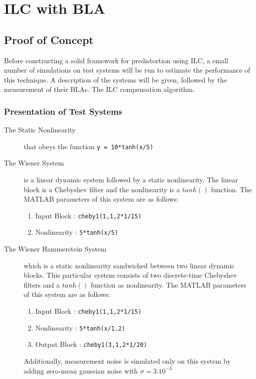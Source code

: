 %
%
\section{ILC with BLA}

	\subsection{Proof of Concept}
	Before constructing a solid framework for predistortion using ILC, a small number of simulations on test systems will be run to estimate the performance of this technique. A description of the systems will be given, followed by the measurement of their BLAs. The ILC compensation algorithm.

	\subsubsection{Presentation of Test Systems}
	\begin{description}
			\item[The Static Nonlinearity] that obeys the function \verb+y = 10*tanh(x/5)+

			 \item[The Wiener System] is a linear dynamic system followed by a static nonlinearity. The linear block is a Chebyshev filter and the nonlinearity is a $tanh()$ function. The MATLAB parameters of this system are as follows:
			\begin{enumerate}
			 	\item Input Block  : \verb+cheby1(1,1,2*1/15)+
			 	\item Nonlinearity : \verb+5*tanh(x/5)+
			 \end{enumerate} 

			\item[The Wiener Hammerstein System] which is a static nonlinearity sandwiched between two linear dynamic blocks. This particular system consists of two discrete-time Chebyshev filters and a $tanh()$ function as nonlinearity.
			The MATLAB parameters of this system are as follows:
			\begin{enumerate}
			 	\item Input Block  : \verb+cheby1(1,1,2*1/15)+
			 	\item Nonlinearity : \verb+5*tanh(x/1.2)+
			 	\item Output Block : \verb+cheby1(3,1,2*1/20)+
			 \end{enumerate} 
			 Additionally, measurement noise is simulated only on this system by adding zero-mean gaussian noise with $\sigma= 3.10^{-3}$
	\end{description}

